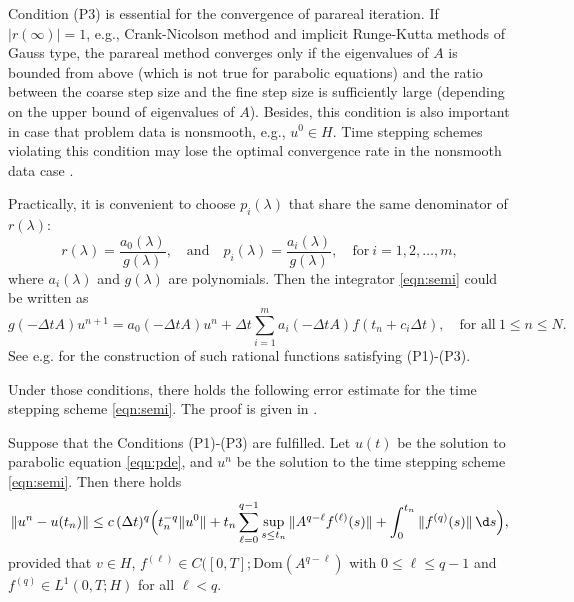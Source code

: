 \begin{remark}
Condition (P3) is essential for the convergence of parareal iteration.
If $|r(\infty)| = 1$, e.g., Crank-Nicolson method and implicit Runge-Kutta methods of Gauss type,
the parareal method converges only if the eigenvalues of $A$ is bounded from above
(which is not true for parabolic equations)
and the ratio between the coarse step size and the fine step size is sufficiently large (depending on the upper bound of eigenvalues of $A$). Besides, this condition is also important in case that problem data is nonsmooth, e.g., $u^0\in H$. Time stepping schemes violating this condition may lose the optimal convergence rate in the nonsmooth data case \cite[Chapter 8]{Thomee:2006}.
\end{remark}

Practically, it is convenient to choose $p_i(\lambda)$ that share the same denominator of $ r (\lambda)$:
$$ r (\lambda) = \frac{a_0(\lambda)}{g(\lambda)},\quad \text{and} \quad p_i(\lambda) = \frac{a_i(\lambda)}{g(\lambda)},\quad \text{for}~i=1,2,\ldots,m,$$
where $a_i(\lambda)$ and $g(\lambda)$ are polynomials.
Then the integrator \eqref{eqn:semi} could be written as
\begin{equation*}
g(-{\Delta t} A) u^{n+1} = a_0(-{\Delta t} A) u^{n} + {\Delta t} \sum_{i=1}^m a_i(-{\Delta t} A) f(t_n+c_i\Delta t) ,\quad \text{for all}~1 \le n\le N.
\end{equation*}
See e.g. \cite[pp. 131]{Thomee:2006} for the construction of such rational functions satisfying (P1)-(P3).\vskip5pt

Under those conditions, there holds the following error estimate for the time stepping scheme \eqref{eqn:semi}.
The proof is given in \cite[Theorems 7.2 and 8.3]{Thomee:2006}.
\begin{lemma}\label{lem:conv-00}
Suppose that the Conditions (P1)-(P3) are fulfilled.
Let $u(t)$ be the solution to parabolic equation \eqref{eqn:pde}, and $u^n$
be the solution to the time stepping scheme \eqref{eqn:semi}. Then there holds
\begin{equation*}%
\|u^n - u(t_n)\|\leq
c\, (\Delta t)^q \Big( t_n^{-q} \| u^0 \|
+ t_n \sum_{\ell=0}^{q-1} \sup_{s\le t_n} \| A^{q-\ell}f^{(\ell)}(s)  \| + \int_0^{t_n}
\| f^{(q)}(s) \|\,\d s\Big),
\end{equation*}
provided that $v \in H$, $f^{(\ell)}\in C([0,T];\text{Dom}(A^{q-\ell})$ with $0\le \ell\le q-1$ and $f^{(q)} \in L^1(0,T; H)$ for all $\ell<q$.
\end{lemma}

